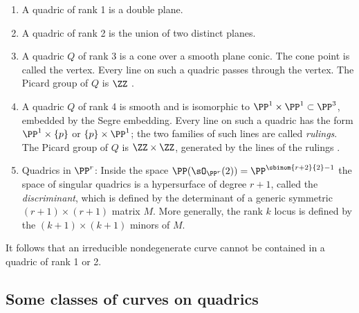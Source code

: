 \begin{enumerate}
\item A quadric of rank 1 is a double plane.
%
\item A quadric of rank 2 is the union of two distinct planes. 
\item A quadric $Q$ of rank 3 is a cone over a smooth plane conic. The cone point is called the vertex. Every line
%
on such a quadric passes through the vertex. The 
Picard group
%
of $Q$ is $\ZZ$
\cite[Exercise II.6.5]{Hartshorne1977}.

\item A quadric $Q$ of rank 4 is smooth and is isomorphic to
  $\PP^{1}\times \PP^{1} \subset \PP^{3}$, embedded by the Segre
  embedding. Every line on such a quadric has the form $\PP^{1}\times
  \{p\}$ or $\{p\} \times \PP^{1}$; the two families of such lines are
  called 
\emph{rulings}.
\unskip
{}%
%
\label{smooth quadric}
The Picard group of $Q$ is $\ZZ\times \ZZ$, generated by the lines of the rulings
\cite[Example II.6.1]{Hartshorne1977}.

\item Quadrics in $\PP^{r}$: Inside the space $\PP(\sO_{\PP^{r}}(2)) = \PP^{\sbinom{r+2}{2}-1}$ the space
of singular quadrics is a hypersurface of degree $r+1$, called the \emph{discriminant}, which is defined by the determinant of a generic symmetric
%
$(r+1)\times (r+1)$ matrix $M$. More generally, the rank $k$ locus is defined by the $(k+1)\times (k+1)$
minors of $M$.
\end{enumerate}


It follows that
an irreducible nondegenerate  curve cannot be contained in a quadric of rank 1 or 2.

\subsection*{Some classes of curves on quadrics}

